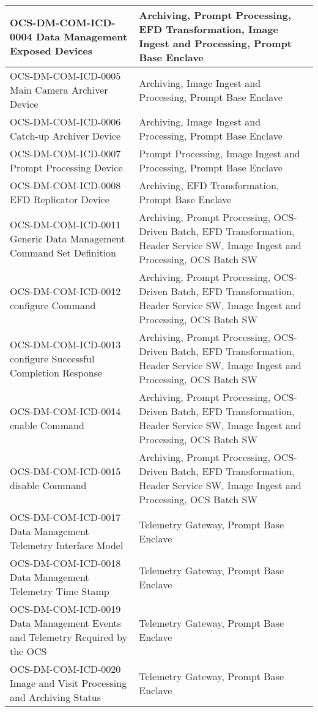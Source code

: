 \begin{xtabular}{p{0.4\textwidth}p{0.55\textwidth}}
OCS-DM-COM-ICD-0004 Data Management Exposed Devices & Archiving, Prompt Processing, EFD Transformation, Image Ingest and Processing, Prompt Base Enclave \\ \hline
OCS-DM-COM-ICD-0005 Main Camera Archiver Device & Archiving, Image Ingest and Processing, Prompt Base Enclave \\ \hline
OCS-DM-COM-ICD-0006 Catch-up Archiver Device & Archiving, Image Ingest and Processing, Prompt Base Enclave \\ \hline
OCS-DM-COM-ICD-0007 Prompt Processing Device & Prompt Processing, Image Ingest and Processing, Prompt Base Enclave \\ \hline
OCS-DM-COM-ICD-0008 EFD Replicator Device & Archiving, EFD Transformation, Prompt Base Enclave \\ \hline
OCS-DM-COM-ICD-0011 Generic Data Management Command Set Definition & Archiving, Prompt Processing, OCS-Driven Batch, EFD Transformation, Header Service SW, Image Ingest and Processing, OCS Batch SW \\ \hline
OCS-DM-COM-ICD-0012 configure Command & Archiving, Prompt Processing, OCS-Driven Batch, EFD Transformation, Header Service SW, Image Ingest and Processing, OCS Batch SW \\ \hline
OCS-DM-COM-ICD-0013 configure Successful Completion Response & Archiving, Prompt Processing, OCS-Driven Batch, EFD Transformation, Header Service SW, Image Ingest and Processing, OCS Batch SW \\ \hline
OCS-DM-COM-ICD-0014 enable Command & Archiving, Prompt Processing, OCS-Driven Batch, EFD Transformation, Header Service SW, Image Ingest and Processing, OCS Batch SW \\ \hline
OCS-DM-COM-ICD-0015 disable Command & Archiving, Prompt Processing, OCS-Driven Batch, EFD Transformation, Header Service SW, Image Ingest and Processing, OCS Batch SW \\ \hline
OCS-DM-COM-ICD-0017 Data Management Telemetry Interface Model & Telemetry Gateway, Prompt Base Enclave \\ \hline
OCS-DM-COM-ICD-0018 Data Management Telemetry Time Stamp & Telemetry Gateway, Prompt Base Enclave \\ \hline
OCS-DM-COM-ICD-0019 Data Management Events and Telemetry Required by the OCS & Telemetry Gateway, Prompt Base Enclave \\ \hline
OCS-DM-COM-ICD-0020 Image and Visit Processing and Archiving Status & Telemetry Gateway, Prompt Base Enclave \\ \hline

\end{xtabular}
